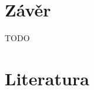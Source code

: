 \documentclass[12pt]{article}
\begin{document}
%

\section{Závěr}

%

TODO

\section{Literatura}

\appendix
\end{document}
